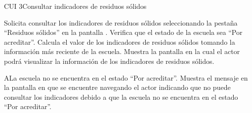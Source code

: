 \begin{UseCase}{CUI 3}{Consultar indicadores de residuos sólidos}
	



	

	
\end{UseCase}
 \begin{UCtrayectoria}
    \UCpaso[\UCactor] Solicita consultar los indicadores de residuos sólidos seleccionando la pestaña ``Residuos sólidos'' en la pantalla .
    \UCpaso[\UCsist] Verifica que el estado de la escuela sea ``Por acreditar''. 
    \UCpaso[\UCsist] Calcula el valor de los indicadores de residuos sólidos tomando la información más reciente de la escuela.%
    \UCpaso[\UCsist] Muestra la pantalla  en la cual el actor podrá visualizar la información de los indicadores de residuos sólidos.
\end{UCtrayectoria}
 
 \begin{UCtrayectoriaA}{A}{La escuela no se encuentra en el estado ``Por acreditar''.}
    \UCpaso[\UCsist] Muestra el mensaje  en la pantalla en que se encuentre navegando el
    actor indicando que no puede consultar los indicadores debido a que la escuela no se encuentra en el estado ``Por acreditar''. 
 \end{UCtrayectoriaA}
